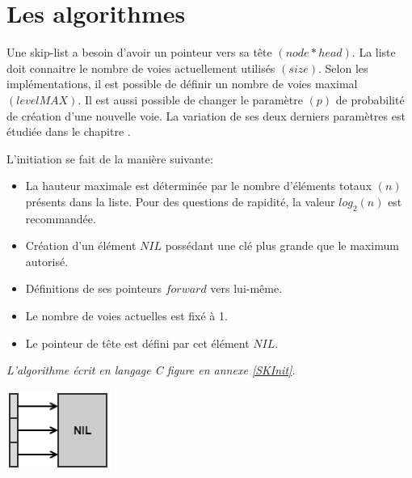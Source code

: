 \documentclass[hidelinks,a4paper, 12pt]{article}
\begin{document}
	\newpage
	\section{Les algorithmes}
	Une skip-list a besoin d'avoir un pointeur vers sa tête $(node* head)$. La liste doit connaitre le nombre de voies actuellement utilisés $(size)$. Selon les implémentations, il est possible de définir un nombre de voies maximal $(levelMAX)$. Il est aussi possible de changer le paramètre $(p)$ de probabilité de création d'une nouvelle voie. La variation de ses deux derniers paramètres est étudiée dans le chapitre .
	
	
	L'initiation se fait de la manière suivante:
	\begin{itemize}
		\item La hauteur maximale est déterminée par le nombre d'éléments totaux $(n)$ présents dans la liste. Pour des questions de rapidité, la valeur $log_2(n)$ est recommandée.
		\item Création d'un élément $NIL$ possédant une clé plus grande que le maximum autorisé.
		\item Définitions de ses pointeurs $forward$ vers lui-même.
		\item Le nombre de voies actuelles est fixé à 1.
		\item Le pointeur de tête est défini par cet élément $NIL$.
	\end{itemize}
	\emph{L'algorithme écrit en langage C figure en annexe \ref{SKInit}.}
	
	\includegraphics{img/init}
	
\end{document}
